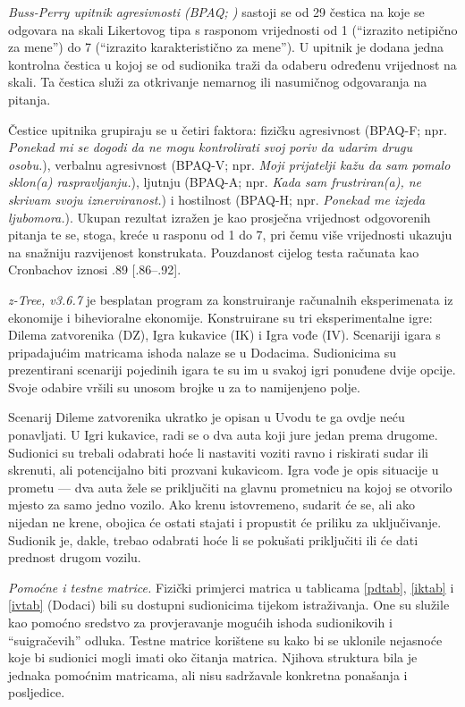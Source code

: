 \documentclass[a4paper, 12pt]{report}
\begin{document}
\emph{Buss-Perry upitnik agresivnosti (BPAQ; \citealp{buss1992aggression})}  sastoji se od
29 čestica na koje se odgovara na skali Likertovog tipa s rasponom vrijednosti
od 1 (\enquote{izrazito netipično za mene}) do 7 (\enquote{izrazito
    karakteristično za mene}). U upitnik je dodana jedna kontrolna čestica u
kojoj se od sudionika traži da odaberu određenu vrijednost na skali. Ta čestica
služi za otkrivanje nemarnog ili nasumičnog odgovaranja na pitanja.

Čestice
upitnika grupiraju se u četiri faktora: fizičku agresivnost
(BPAQ-F; npr. \textit{Ponekad mi se dogodi da ne mogu kontrolirati svoj poriv da udarim
    drugu osobu.}), verbalnu agresivnost (BPAQ-V; npr.
\textit{Moji prijatelji kažu da sam
    pomalo sklon(a) raspravljanju.}), ljutnju
(BPAQ-A; npr. \textit{Kada sam frustriran(a),
    ne skrivam svoju iznerviranost.}) i
hostilnost (BPAQ-H; npr. \textit{Ponekad me izjeda
    ljubomora.}). Ukupan rezultat izražen je kao
prosječna vrijednost odgovorenih pitanja te se, stoga, kreće u rasponu od 1
do 7, pri čemu više vrijednosti ukazuju na snažniju razvijenost konstrukata.
Pouzdanost cijelog testa
računata kao Cronbachov {\textalpha} iznosi .89 [.86--.92].

\emph{z-Tree, v3.6.7} \citep{fischbacher2007z} je besplatan program za
konstruiranje računalnih eksperimenata iz ekonomije i bihevioralne ekonomije.
Konstruirane su tri eksperimentalne igre: Dilema zatvorenika (DZ), Igra kukavice
(IK) i Igra vođe (IV). Scenariji igara s pripadajućim matricama ishoda nalaze se
u Dodacima. Sudionicima su prezentirani scenariji pojedinih igara te su im
u svakoj igri ponuđene dvije  opcije. Svoje odabire vršili su unosom
brojke u za to namijenjeno polje.

Scenarij Dileme zatvorenika ukratko je opisan u Uvodu te ga ovdje neću
ponavljati. U Igri kukavice, radi se o dva auta koji jure jedan prema drugome.
Sudionici su trebali odabrati hoće li nastaviti voziti ravno i riskirati sudar ili
skrenuti, ali potencijalno biti prozvani kukavicom. Igra vođe je opis situacije
u prometu --- dva auta žele se priključiti na glavnu prometnicu na kojoj se
otvorilo mjesto za samo jedno vozilo. Ako krenu
istovremeno, sudarit će se, ali ako nijedan ne  krene, obojica će ostati stajati
i propustit će priliku za uključivanje. Sudionik je, dakle, trebao odabrati hoće
li se pokušati priključiti ili će dati prednost drugom vozilu.

\emph{Pomoćne i testne matrice.} Fizički primjerci matrica u tablicama
\ref{pdtab}, \ref{iktab} i \ref{ivtab} (Dodaci) bili su dostupni sudionicima tijekom
istraživanja. One su služile kao pomoćno sredstvo za provjeravanje 
mogućih ishoda sudionikovih i \enquote{suigračevih} odluka. 
Testne matrice korištene su kako bi se uklonile nejasnoće koje bi sudionici
mogli imati oko čitanja matrica. Njihova struktura bila je jednaka pomoćnim
matricama, ali nisu sadržavale konkretna ponašanja i posljedice.
\end{document}
